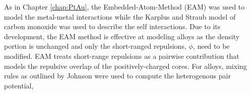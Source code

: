 %
%
As in Chapter \ref{chap:PtAu}, the Embedded-Atom-Method (EAM) was used to model
the metal-metal interactions while the Karplus and Straub model of carbon
monoxide was used to describe the  self interactions. Due to its development, the EAM
method is effective at modeling alloys as the density portion is unchanged
and only the short-ranged repulsions, $\phi$, need to be modified. EAM treats
short-range repulsions as a pairwise contribution that models the repulsive
overlap of the positively-charged cores. For alloys, mixing rules as outlined
by Johnson \citep{Johnson:1989yr} were used to compute the heterogenous pair
potential,


